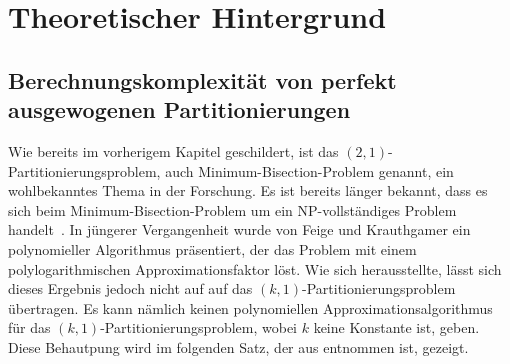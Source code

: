 
\newcommand{\apxalg}{\mathcal{A}}

\chapter{Theoretischer Hintergrund}\label{chapter:theorie}
\section{Berechnungskomplexität von perfekt ausgewogenen Partitionierungen }
Wie bereits im vorherigem Kapitel geschildert, ist das $(2,1)$-Partitionierungsproblem, auch  Minimum-Bisection-Problem genannt, ein wohlbekanntes Thema in der Forschung. 
Es ist bereits länger bekannt, dass es sich beim Minimum-Bisection-Problem um ein NP-vollständiges Problem handelt~\parencite{gj79}.
In jüngerer Vergangenheit wurde von Feige und Krauthgamer ein polynomieller Algorithmus präsentiert, der das Problem mit einem polylogarithmischen Approximationsfaktor löst. \parencite{fk02}
Wie sich herausstellte, lässt sich dieses Ergebnis jedoch nicht auf auf das $(k,1)$-Partitionierungsproblem übertragen.
Es kann nämlich keinen polynomiellen Approximationsalgorithmus für das $(k,1)$-Partitionierungsproblem, wobei $k$ keine Konstante ist, geben.
Diese Behautpung wird im folgenden Satz, der aus \parencite{ar06} entnommen ist, gezeigt. \\

